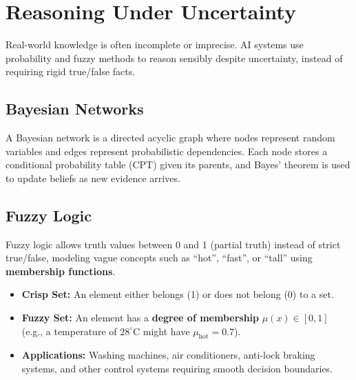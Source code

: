 \documentclass[11pt,a4paper]{article}
\begin{document}
\section{Reasoning Under Uncertainty}

\begin{definitionbox}
Real-world knowledge is often incomplete or imprecise. AI systems use probability and fuzzy methods to reason sensibly despite uncertainty, instead of requiring rigid true/false facts.
\end{definitionbox}

\subsection{Bayesian Networks}
\begin{conceptbox}
A Bayesian network is a directed acyclic graph where nodes represent random variables and edges represent probabilistic dependencies. Each node stores a conditional probability table (CPT) given its parents, and Bayes' theorem is used to update beliefs as new evidence arrives.
\end{conceptbox}

\subsection{Fuzzy Logic}
\begin{definitionbox}
Fuzzy logic allows truth values between 0 and 1 (partial truth) instead of strict true/false, modeling vague concepts such as ``hot'', ``fast'', or ``tall'' using \textbf{membership functions}.
\end{definitionbox}
\begin{itemize}[leftmargin=*]
  \item \textbf{Crisp Set:} An element either belongs (1) or does not belong (0) to a set.
  \item \textbf{Fuzzy Set:} An element has a \textbf{degree of membership} $\mu(x) \in [0,1]$ (e.g., a temperature of $28^{\circ}$C might have $\mu_{\text{hot}}=0.7$).
  \item \textbf{Applications:} Washing machines, air conditioners, anti-lock braking systems, and other control systems requiring smooth decision boundaries.
\end{itemize}

\end{document}
